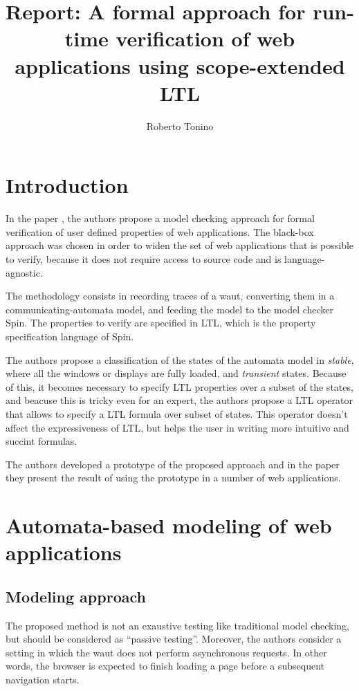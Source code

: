 \documentclass[a4paper,10pt]{article}
\title{Report: A formal approach for run-time verification of web applications using scope-extended LTL}
\author{Roberto Tonino}
\begin{document}
\maketitle

\tableofcontents

\clearpage

\section{Introduction}
\label{introduction}

In the paper , the authors propose a model checking approach for formal verification of user defined properties of web applications. The black-box approach was chosen in order to widen the set of web applications that is possible to verify, because it does not require access to source code and is language-agnostic.

The methodology consists in recording traces of a \gls{waut}, converting them in a communicating-automata model, and feeding the model to the model checker Spin. The properties to verify are specified in LTL, which is the property specification language of Spin.

The authors propose a classification of the states of the automata model in \emph{stable}, where all the windows or displays are fully loaded, and \emph{transient} states.  Because of this, it becomes necessary to specify LTL properties over a subset of the states, and beacuse this is tricky even for an expert, the authors propose a LTL operator that allows to specify a LTL formula over subset of states. This operator doesn't affect the expressiveness of LTL, but helps the user in writing more intuitive and succint formulas.

The authors developed a prototype of the proposed approach and in the paper they present the result of using the prototype in a number of web applications.

\section{Automata-based modeling of web applications}
\label{automata-based-modeling-of-web-applications}


\subsection{Modeling approach}
\label{modeling-approach}

The proposed method is not an exaustive testing like traditional model checking, but should be considered as ``passive testing''. Moreover, the authors consider a setting in which the \gls{waut} does not perform asynchronous requests. In other words, the browser is expected to finish loading a page before a subsequent navigation starts.
\end{document}

